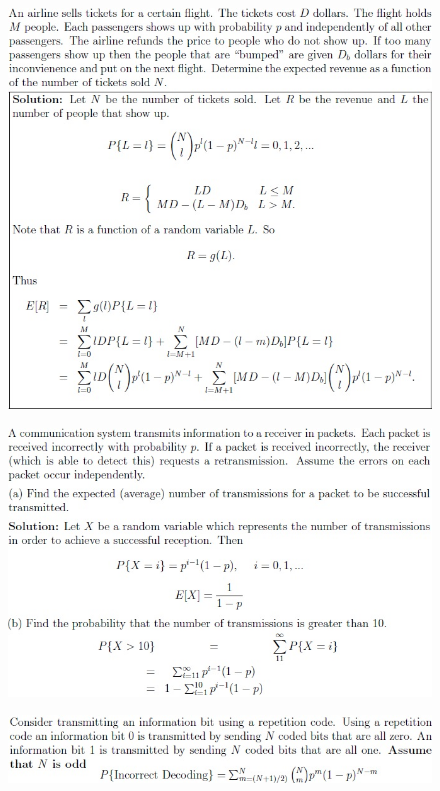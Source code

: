 \documentclass[11pt,landscape]{article}
\begin{document}
\begin{multicols}{3}
\setlength{\premulticols}{1pt}
\setlength{\postmulticols}{1pt}
\setlength{\multicolsep}{1pt}
\setlength{\columnsep}{2pt}

\begin{figure}[H]
    \includegraphics[scale=0.46]{./Images/1/Airplanes.jpg}
\end{figure}
\begin{figure}[H]
    \includegraphics[scale=0.46]{./Images/1/Communication.jpg}
\end{figure}
\begin{figure}[H]
    \includegraphics[scale=0.46]{./Images/1/HammingCode.jpg}

\end{figure}
\end{multicols}
\end{document}
